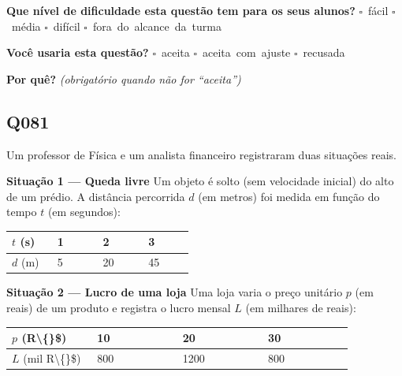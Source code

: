 \documentclass[11pt,a4paper]{article}
\begin{document}
\textbf{Que nível de dificuldade esta questão tem para os seus alunos?}\quad
\mbox{$\square$~fácil} \quad \mbox{$\square$~média} \quad
\mbox{$\square$~difícil} \quad \mbox{$\square$~fora do alcance da turma}

\textbf{Você usaria esta questão?}\quad
\mbox{$\square$~aceita} \quad \mbox{$\square$~aceita com ajuste} \quad
\mbox{$\square$~recusada}

\textbf{Por quê?} \emph{(obrigatório quando não for ``aceita'')}

\underline{\hspace{\linewidth}}

\underline{\hspace{\linewidth}}
\vspace{0.6em}

\begin{samepage}
\subsection*{Q081}
Um professor de Física e um analista financeiro registraram duas situações reais.

\textbf{Situação 1 — Queda livre}
Um objeto é solto (sem velocidade inicial) do alto de um prédio. A distância percorrida $d$ (em metros) foi medida em função do tempo $t$ (em segundos):

\begin{center}
\begin{tabular}{|p{0.215\linewidth}|p{0.215\linewidth}|p{0.215\linewidth}|p{0.215\linewidth}|}
\hline
\textbf{$t$ (s)} & \textbf{1} & \textbf{2} & \textbf{3} \\
\hline
$d$ (m) & 5 & 20 & 45 \\
\hline
\end{tabular}
\end{center}

\textbf{Situação 2 — Lucro de uma loja}
Uma loja varia o preço unitário $p$ (em reais) de um produto e registra o lucro mensal $L$ (em milhares de reais):

\begin{center}
\begin{tabular}{|p{0.215\linewidth}|p{0.215\linewidth}|p{0.215\linewidth}|p{0.215\linewidth}|}
\hline
\textbf{$p$ (R\textbackslash\{\}\$)} & \textbf{10} & \textbf{20} & \textbf{30} \\
\hline
$L$ (mil R\textbackslash\{\}\$) & 800 & 1200 & 800 \\
\hline
\end{tabular}
\end{center}


\end{samepage}
\end{document}
